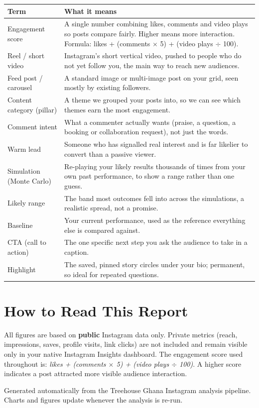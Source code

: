\documentclass[11pt,a4paper]{article}
\begin{document}
\begin{center}
\begin{tabular}{>{\raggedright\arraybackslash}p{3.6cm}>{\raggedright\arraybackslash}p{11cm}}
\toprule
\textbf{Term} & \textbf{What it means} \\
\midrule
Engagement score & A single number combining likes, comments and video plays so posts compare fairly. Higher means more interaction. Formula: likes + (comments $\times$ 5) + (video plays $\div$ 100). \\
Reel / short video & Instagram's short vertical video, pushed to people who do not yet follow you, the main way to reach new audiences. \\
Feed post / carousel & A standard image or multi-image post on your grid, seen mostly by existing followers. \\
Content category (pillar) & A theme we grouped your posts into, so we can see which themes earn the most engagement. \\
Comment intent & What a commenter actually wants (praise, a question, a booking or collaboration request), not just the words. \\
Warm lead & Someone who has signalled real interest and is far likelier to convert than a passive viewer. \\
Simulation (Monte Carlo) & Re-playing your likely results thousands of times from your own past performance, to show a range rather than one guess. \\
Likely range & The band most outcomes fell into across the simulations, a realistic spread, not a promise. \\
Baseline & Your current performance, used as the reference everything else is compared against. \\
CTA (call to action) & The one specific next step you ask the audience to take in a caption. \\
Highlight & The saved, pinned story circles under your bio; permanent, so ideal for repeated questions. \\
\bottomrule
\end{tabular}
\end{center}

\section*{\color{tregreen}How to Read This Report}

All figures are based on \textbf{public} Instagram data only.
Private metrics (reach, impressions, saves, profile visits, link clicks) are not included
and remain visible only in your native Instagram Insights dashboard.
The engagement score used throughout is: \textit{likes + (comments $\times$ 5) + (video plays $\div$ 100)}.
A higher score indicates a post attracted more visible audience interaction.

\vfill
\begin{center}
{\small\color{tregrey}Generated automatically from the Treehouse Ghana Instagram analysis pipeline.
Charts and figures update whenever the analysis is re-run.}
\end{center}
\end{document}
